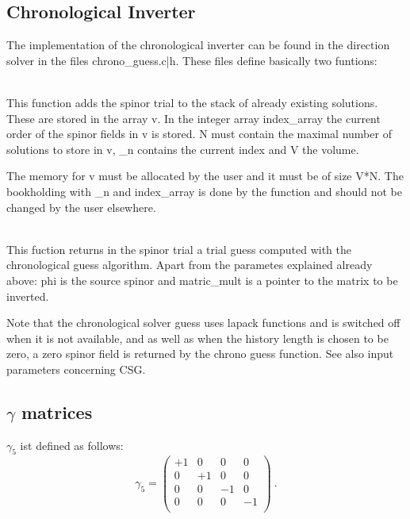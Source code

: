 \subsection{Chronological Inverter}

The implementation of the chronological inverter \cite{Brower:1995vx}
can be found in the direction {\ttfamily solver} in the files
{\ttfamily chrono\_guess.c|h}. These files define basically two
funtions:

\\
This function adds the spinor {\ttfamily trial} to the stack of
already existing solutions. These are stored in the array {\ttfamily
  v}. In the integer array {\ttfamily index\_array} the current order
of the spinor fields in {\ttfamily v} is stored. {\ttfamily N} must
contain the maximal number of solutions to store in {\ttfamily v},
{\ttfamily \_n} contains the current index and {\ttfamily V} the volume.

The memory for {\ttfamily v} must be allocated by the user and it must
be of size {\ttfamily V*N}. The bookholding with {\ttfamily \_n} and
{\ttfamily index\_array} is done by the function and should not be
changed by the user elsewhere.

\\
This fuction returns in the spinor {\ttfamily trial} a trial guess
computed with the chronological guess algorithm. Apart from the
parametes explained already above: {\ttfamily phi} is the source
spinor and {\ttfamily matric\_mult} is a pointer to the matrix to be
inverted.

Note that the chronological solver guess uses lapack functions and is
switched off when it is not available, and as well as when the history
length is chosen to be zero, a zero spinor field is returned by the
chrono guess function. See also input parameters concerning CSG.

\subsection{$\gamma$ matrices}
\label{sec:gammas}
$\gamma_5$ ist defined as follows:
\[
  \gamma_5 =
  \begin{pmatrix}
    +1 & 0 & 0 & 0 \\
    0 & +1 & 0 & 0 \\
    0 & 0 & -1 & 0 \\
    0 & 0 & 0 & -1 \\    
  \end{pmatrix}\ .
\]

